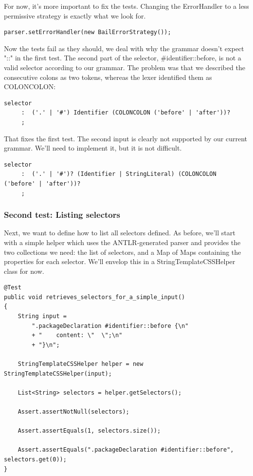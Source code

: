\documentclass[11pt]{article}
\begin{document}
For now, it's more important to fix the tests. Changing the ErrorHandler to a less permissive strategy is exactly what we look for.

\begin{verbatim}
parser.setErrorHandler(new BailErrorStrategy());
\end{verbatim}

Now the tests fail as they should, we deal with why the grammar doesn't expect "::" in the first test. The second part of the selector, \#identifier::before, is not a valid selector according to our grammar.
The problem was that we described the consecutive colons as two tokens, whereas the lexer identified them as COLONCOLON:

\begin{verbatim}
selector
     :	('.' | '#') Identifier (COLONCOLON ('before' | 'after'))?
     ;
\end{verbatim}

That fixes the first test. The second input is clearly not supported by our current grammar. We'll need to implement it, but it is not difficult.

\begin{verbatim}
selector
     :	('.' | '#')? (Identifier | StringLiteral) (COLONCOLON ('before' | 'after'))?
     ;
\end{verbatim}

\subsubsection{Second test: Listing selectors}
\label{sec-1-4-3}

Next, we want to define how to list all selectors defined. As before, we'll start with a simple helper which uses
the ANTLR-generated parser and provides the two collections we need: the list of selectors, and a Map of Maps containing the properties for each selector.
We'll envelop this in a StringTemplateCSSHelper class for now.

\begin{verbatim}
@Test
public void retrieves_selectors_for_a_simple_input()
{
    String input =
        ".packageDeclaration #identifier::before {\n"
        + "    content: \"  \";\n"
        + "}\n";

    StringTemplateCSSHelper helper = new StringTemplateCSSHelper(input);

    List<String> selectors = helper.getSelectors();

    Assert.assertNotNull(selectors);

    Assert.assertEquals(1, selectors.size());

    Assert.assertEquals(".packageDeclaration #identifier::before", selectors.get(0));
}
\end{verbatim}
\end{document}
